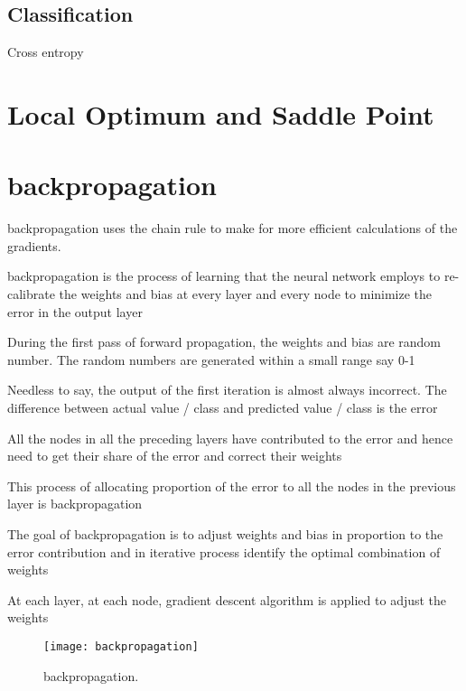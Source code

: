 	\subsection{Classification}
Cross entropy


	\section{Local Optimum and Saddle Point}

	\section{backpropagation}
backpropagation uses the chain rule to make for more efficient calculations of the gradients.

	\begin{bulletedlist}
		\item backpropagation is the process of learning that the neural network employs to re-calibrate the weights and bias at every layer and every node to minimize the error in the output layer
		\item During the first pass of forward propagation, the weights and bias are random number. The random numbers are generated within a small range say 0-1
		\item Needless to say, the output of the first iteration is almost always incorrect. The difference between actual value / class and predicted value / class is the error
		\item All the nodes in all the preceding layers have contributed to the error and hence need to get their share of the error and correct their weights
		\item This process of allocating proportion of the error to all the nodes in the previous layer is backpropagation
		\item The goal of backpropagation is to adjust weights and bias in proportion to the error contribution and in iterative process identify the optimal combination of weights
		\item At each layer, at each node, gradient descent algorithm is applied to adjust the weights
	\end{bulletedlist}

 	\begin{figure}[htb]
		\centering
		\texttt{[image: backpropagation]}
		\caption[backpropagation]{backpropagation.}
		\label{fig:backpropagation}
	\end{figure}

